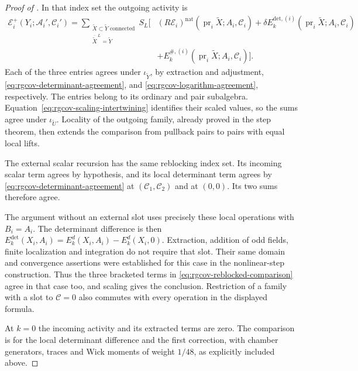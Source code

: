 \begin{proof}[Proof of ]
In that index set the outgoing activity is
\begin{align}
 \mathscr E_i^+(Y_i;\mathscr A_i',\mathscr C_i')
  =\sum_{\substack{\widetilde X\subset\widetilde Y\text{ connected}\\
                         \overline{\widetilde X}^{\,L}=\widetilde Y}}
 S_L\Big[&
     (R\mathscr E_i)^{\mathrm{nat}}
                  (\operatorname{pr}_i\widetilde X;A_i,\mathscr C_i)
       +\delta E_k^{\mathrm{det},(i)}
                  (\operatorname{pr}_i\widetilde X;A_i,\mathscr C_i)
       \nonumber\\
       &+E_k^{\#,(i)}
                  (\operatorname{pr}_i\widetilde X;A_i,\mathscr C_i)\Big].
                                      \label{eq:rgcov-reblocked-comparison}
\end{align}
Each of the three entries agrees under
$\iota_{\widetilde Y}$, by extraction and adjustment,
\eqref{eq:rgcov-determinant-agreement}, and
\eqref{eq:rgcov-logarithm-agreement}, respectively.
The entries belong to its ordinary and pair subalgebra.
Equation~\eqref{eq:rgcov-scaling-intertwining} identifies
their scaled values, so the sums agree under
$\iota_{\widetilde U}$.
Locality of the outgoing family, already proved in
the step theorem, then extends the comparison
from pullback pairs to pairs with equal local lifts.

The external scalar recursion has the same reblocking
index set. Its incoming scalar term agrees by hypothesis,
and its local determinant term agrees by
\eqref{eq:rgcov-determinant-agreement} at
$(\mathscr C_1,\mathscr C_2)$ and at $(0,0)$.
Its two sums therefore agree.

The argument without an external slot uses precisely
these local operations with $B_i=A_i$.
The determinant difference is then
$E_k^{\mathrm{det}}(X_i,A_i)=E_k^d(X_i,A_i)-E_k^d(X_i,0)$.
Extraction, addition of odd fields, finite localization
and integration do not require that slot. Their
same domain and convergence assertions were established
for this case in the nonlinear-step construction.
Thus the three bracketed terms in
\eqref{eq:rgcov-reblocked-comparison} agree in that
case too, and scaling gives the conclusion.
Restriction of a family with a slot to
$\mathscr C=0$ also commutes with every operation
in the displayed formula.

At $k=0$ the incoming activity and its extracted
terms are zero. The comparison is for the local
determinant difference and the first correction,
with chamber generators, traces and Wick moments
of weight $1/48$, as explicitly included above.
\end{proof}


